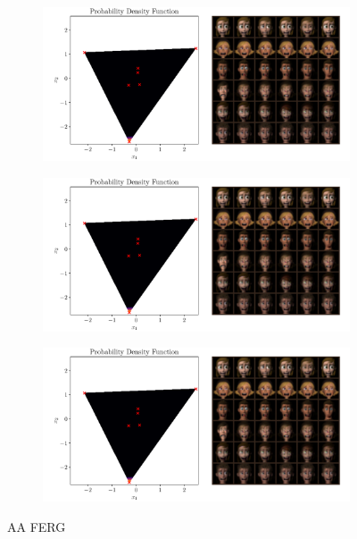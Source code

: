 \begin{figure}[htpb]
    \centering
    \begin{subfigure}[htpb]{\textwidth}
        \centering
        \includegraphics[width=1\linewidth]{figures/samples/aa_ferg1.pdf}
    \end{subfigure}

    \begin{subfigure}[htpb]{\textwidth}
        \centering
        \includegraphics[width=1\linewidth]{figures/samples/aa_ferg1.pdf}
    \end{subfigure}

    \begin{subfigure}[htpb]{\textwidth}
        \centering
        \includegraphics[width=1\linewidth]{figures/samples/aa_ferg1.pdf}
    \end{subfigure}

    \caption{AA FERG}%
    \label{fig:aa_ferg_corners}
\end{figure}


